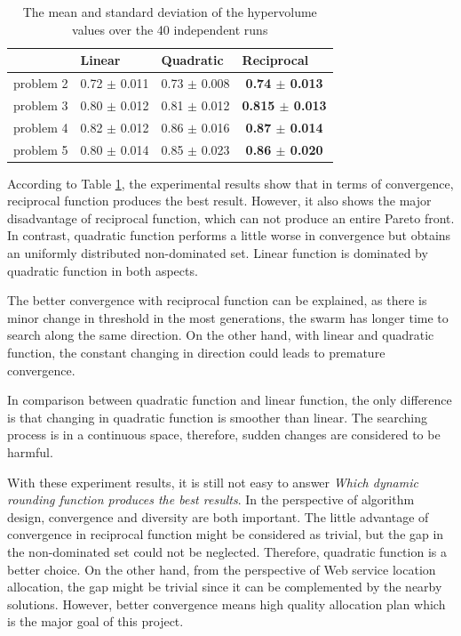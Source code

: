 \begin{table}[H]
\centering
\footnotesize
\caption{The mean and standard deviation of the hypervolume values over the 40 independent runs}
\label{tab:hyperDynamic}
\begin{tabular}{l|c|c|c}
\hline
          & \multicolumn{1}{l|}{Linear} & \multicolumn{1}{l|}{Quadratic} & \multicolumn{1}{l}{Reciprocal}  \\ \hline
problem 2 & 0.72 $\pm$ 0.011            & 0.73 $\pm$ 0.008               & \textbf{0.74 $\pm$ 0.013}  	 \\ 
problem 3 & 0.80 $\pm$ 0.012            & 0.81 $\pm$ 0.012               & \textbf{0.815 $\pm$ 0.013}  		\\ 
problem 4 & 0.82 $\pm$ 0.012            & 0.86 $\pm$ 0.016               & \textbf{0.87 $\pm$ 0.014}  	\\ 
problem 5 & 0.80 $\pm$ 0.014            & 0.85 $\pm$ 0.023               & \textbf{0.86 $\pm$ 0.020}  	\\ \hline
\end{tabular}
\end{table}

According to Table \ref{tab:hyperDynamic}, the experimental results show that in terms of convergence, reciprocal function produces the best result. 
However, it also shows the major disadvantage of reciprocal function, which can not produce an entire Pareto front. In contrast, quadratic function performs
a little worse in convergence but obtains an uniformly distributed non-dominated set. Linear function is dominated by quadratic function in both aspects.

The better convergence with reciprocal function can be explained, as there is minor change in threshold in the most generations, the swarm has longer time to search along the same direction.
On the other hand, with linear and quadratic function, the constant changing in direction could leads to premature convergence.

In comparison between quadratic function and linear function, the only difference is that changing in quadratic function is smoother than linear. 
The searching process is in a continuous space, therefore, sudden changes are considered to be harmful.

With these experiment results, it is still not easy to answer \emph{Which dynamic rounding function produces the best results}. In the perspective of 
algorithm design, convergence and diversity are both important. The little advantage of convergence in reciprocal function might be considered as trivial, but the 
gap in the non-dominated set could not be neglected. Therefore, quadratic function is a better choice. On the other hand, from the perspective of Web service location
allocation, the gap might be trivial since it can be complemented by the nearby solutions. However, better convergence means high quality allocation plan which is 
the major goal of this project.

